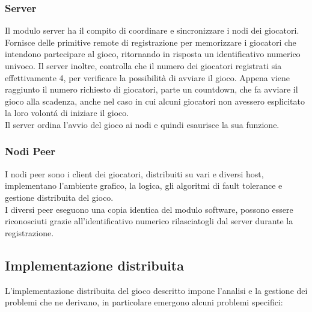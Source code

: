 \documentclass[10pt,a4paper]{article}
\begin{document}
\subsubsection{Server}
Il modulo server ha il compito di coordinare e sincronizzare i nodi dei giocatori. Fornisce delle primitive remote di registrazione per memorizzare i giocatori che intendono partecipare al gioco, ritornando in risposta un identificativo numerico univoco. Il server inoltre, controlla che il numero dei giocatori registrati sia effettivamente 4, per verificare la possibilità di avviare il gioco. Appena viene raggiunto il numero richiesto di giocatori, parte un countdown, che fa avviare il gioco alla scadenza, anche nel caso in cui alcuni giocatori non avessero esplicitato la loro volont\'a di iniziare il gioco. \\ Il server ordina l'avvio del gioco ai nodi e quindi esaurisce la sua funzione.

\subsubsection{Nodi Peer}
I nodi peer sono i client dei giocatori, distribuiti su vari e diversi host, implementano l'ambiente grafico, la logica, gli algoritmi di fault tolerance e gestione distribuita del gioco.\\ I diversi peer eseguono una copia identica del modulo software, possono essere riconosciuti grazie all'identificativo numerico rilasciatogli dal server durante la registrazione.

\subsection{Implementazione distribuita}
L'implementazione distribuita del gioco descritto impone l'analisi e la gestione dei problemi che ne derivano, in particolare emergono alcuni problemi specifici:
\end{document}
